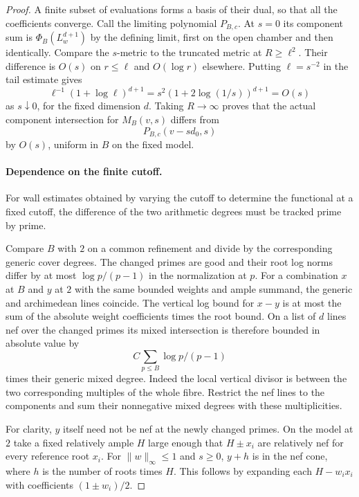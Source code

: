 \begin{proof}
A finite subset of evaluations forms a basis of their
dual, so that all the coefficients converge. Call the limiting
polynomial \(P_{B,c}\). At \(s=0\) its component sum is
\(\Phi_B(L_w^{d+1})\) by the defining limit, first on the open
chamber and then identically. Compare the \(s\)-metric to the
truncated metric at \(R\ge\ell^2\). Their difference is \(O(s)\)
on \(r\le\ell\) and \(O(\log r)\) elsewhere. Putting \(\ell=s^{-2}\) in the tail estimate gives
\[
 \ell^{-1}(1+\log\ell)^{d+1}
 =s^2(1+2\log(1/s))^{d+1}=O(s)
\]
as \(s\downarrow0\), for the fixed dimension \(d\). Taking \(R\to\infty\)
proves that the actual component intersection for \(M_B(v,s)\)
differs from
\[
 P_{B,c}(v-sd_0,s)
\]
by \(O(s)\), uniform in
\(B\) on the fixed model. \label{cor:flag-wall-polynomial-5}

\paragraph{Dependence on the finite cutoff.}

For wall estimates obtained by varying the cutoff to determine the functional at a fixed cutoff, the difference of the two arithmetic degrees must be tracked prime by prime.

Compare \(B\) with \(2\) on a common refinement and divide by
the corresponding generic cover degrees. The changed primes
are good and their root log norms differ by at most
\(\log p/(p-1)\) in the normalization at \(p\). For a combination
\(x\) at \(B\) and \(y\) at \(2\) with the same bounded weights
and ample summand, the generic and archimedean lines coincide.
The vertical log bound for \(x-y\) is at most the sum of the
absolute weight coefficients times the root bound. On a list
of \(d\) lines nef over the changed primes its mixed intersection
is therefore bounded in absolute value by
\[
 C\sum_{p\le B}\log p/(p-1)
\]
times their generic mixed degree.
Indeed the local vertical divisor is between the two corresponding
multiples of the whole fibre. Restrict the nef lines to the
components and sum their nonnegative mixed degrees with these
multiplicities.

For clarity, \(y\) itself need not be nef at the newly changed
primes. On the model at \(2\) take a fixed relatively ample
\(H\) large enough that \(H\pm x_i\) are relatively nef for
every reference root \(x_i\). For \(\|w\|_\infty\le1\) and
\(s\ge0\), \(y+h\) is in the nef cone, where \(h\) is the
number of roots times \(H\). This follows by expanding each
\(H-w_i x_i\) with coefficients \((1\pm w_i)/2\).


\end{proof}
